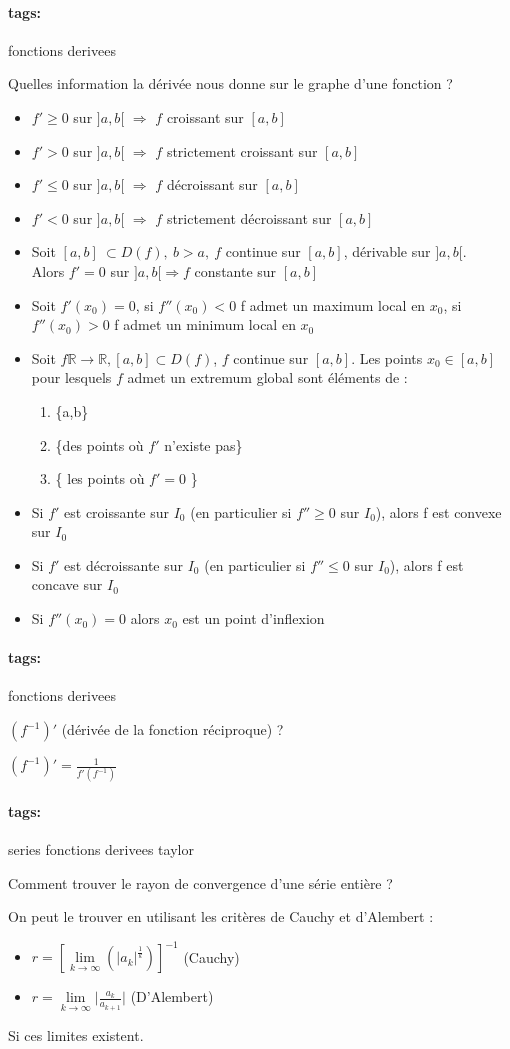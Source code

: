 \documentclass[12pt]{article}
\newcommand*{\xfield}[1]{\begin{mdframed}\centering #1\end{mdframed}\bigskip}
\newenvironment{note}{}{}
\newcommand*{\tags}[1]{\paragraph{tags: }#1}
\begin{document}
\begin{note}
	\tags{fonctions derivees}
	\xfield{Quelles information la dérivée nous donne sur le graphe d'une fonction ?}
	\xfield{\begin{itemize}
		\item $f' \ge 0$ sur $]a,b[$ $\Rightarrow$ $f$ croissant sur $[a,b]$
		\item $f' > 0$ sur $]a,b[$ $\Rightarrow$ $f$ strictement croissant sur $[a,b]$
		\item $f' \le 0$ sur $]a,b[$ $\Rightarrow$ $f$ décroissant sur $[a,b]$
		\item $f' < 0$ sur $]a,b[$ $\Rightarrow$ $f$ strictement décroissant sur $[a,b]$
		\item Soit $[a,b]\ \subset D(f),\ b > a,\ f$ continue sur $[a,b]$, dérivable sur $]a,b[$.\\
		Alors $f'=0$ sur $]a,b[ \Rightarrow f$ constante sur $[a,b]$
		\item Soit $f'(x_0)=0$, si $f''(x_0)<0$ f admet un maximum local en $x_0$,
		si $f''(x_0)>0$ f admet un minimum local en $x_0$
		\item Soit $f \mathbb{R} \to \mathbb{R}, [a,b] \subset D(f)$, $f$ continue sur $[a,b]$. Les points $x_0 \in [a,b]$ pour lesquels $f$ admet un extremum global sont éléments de : \begin{enumerate}
			\item \{a,b\}
			\item \{des points où $f'$ n'existe pas\}
			\item \{ les points où $f'=0$ \}
		\end{enumerate}
		\item Si $f'$ est croissante sur $I_0$ (en particulier si $f'' \ge 0$ sur $I_0$), alors f est convexe sur $I_0$
		\item Si $f'$ est décroissante sur $I_0$ (en particulier si $f'' \le 0$ sur $I_0$), alors f est concave sur $I_0$ 
		\item Si $f''(x_0) = 0$ alors $x_0$ est un point d'inflexion
	\end{itemize} }
\end{note}

\begin{note}
	\tags{fonctions derivees}
	\xfield{$(f^{-1})'$ (dérivée de la fonction réciproque) ?}
	\xfield{$(f^{-1})' =  \frac{1}{f'(f^{-1})}$}
\end{note}

\begin{note}
	\tags{series fonctions derivees taylor}
	\xfield{Comment trouver le rayon de convergence d'une série entière ?}
	\xfield{On peut le trouver en utilisant les critères de Cauchy et d'Alembert :\begin{itemize}
	\item $r = \left[ \lim\limits_{k \to \infty} (\vert a_k \vert^{\frac{1}{k}})\right]^{-1}$ (Cauchy)
	\item $r=  \lim\limits_{k \to \infty} \big| \frac{a_k}{a_{k+1}}\big|$ (D'Alembert)
	\end{itemize}
	 Si ces limites existent.}
\end{note}
\end{document}
